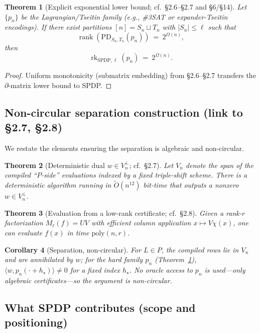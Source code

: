 \documentclass[12pt]{article}
\newtheorem{theorem}{Theorem}
\newtheorem{corollary}[theorem]{Corollary}
\theoremstyle{definition}
\theoremstyle{definition}
\theoremstyle{remark}
\theoremstyle{remark}
\begin{document}
\begin{theorem}[Explicit exponential lower bound; cf.\ \S2.6--\S2.7 and \S6/\S14]\label{thm:explicit-exp-lower-bound}
Let $\{p_n\}$ be the Lagrangian/Tseitin family (e.g., \#3SAT or expander-Tseitin encodings). If there exist partitions $[n]=S_n\sqcup T_n$ with $|S_n|\le\ell$ such that
\[
\operatorname{rank}(\mathrm{PD}_{S_n,T_n}(p_n)) \ =\ 2^{\Omega(n)},
\]
then
\[
\operatorname{rk}_{\mathrm{SPDP},\ell}(p_n) \ =\ 2^{\Omega(n)}.
\]
\end{theorem}

\begin{proof}
Uniform monotonicity (submatrix embedding) from \S2.6--\S2.7 transfers the $\partial$-matrix lower bound to SPDP.
\end{proof}

\subsection{Non-circular separation construction (link to \S2.7, \S2.8)}

We restate the elements ensuring the separation is algebraic and non-circular.

\begin{theorem}[Deterministic dual $w\in V_n^{\perp}$; cf.\ \S2.7]\label{thm:det-dual-ref}
Let $V_n$ denote the span of the compiled ``$P$-side'' evaluations indexed by a fixed triple-shift scheme. There is a deterministic algorithm running in $\tilde O(n^{12})$ bit-time that outputs a nonzero $w\in V_n^{\perp}$.
\end{theorem}

\begin{theorem}[Evaluation from a low-rank certificate; cf.\ \S2.8]\label{thm:eval-cert-ref}
Given a rank-$r$ factorization $M_\ell(f)=UV$ with efficient column application $x\mapsto V\chi(x)$, one can evaluate $f(x)$ in time $\mathrm{poly}(n,r)$.
\end{theorem}

\begin{corollary}[Separation, non-circular]\label{cor:sep-non-circular}
For $L\in P$, the compiled rows lie in $V_n$ and are annihilated by $w$; for the hard family $p_n$ (Theorem~\ref{thm:explicit-exp-lower-bound}), $\langle w, p_n(\cdot+h_\star)\rangle\neq 0$ for a fixed index $h_\star$. No oracle access to $p_n$ is used---only algebraic certificates---so the argument is non-circular.
\end{corollary}

\subsection{What SPDP contributes (scope and positioning)}
\end{document}
